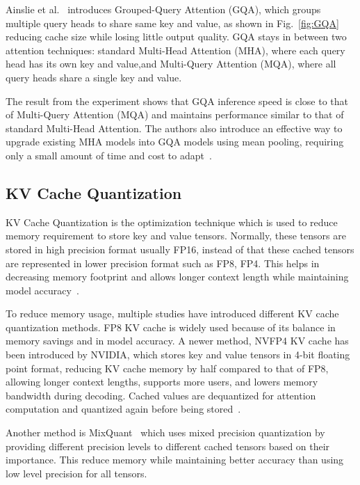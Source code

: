 \documentclass[conference]{IEEEtran}
\begin{document}
Ainslie et al.~\cite{ainslie2023gqa} introduces Grouped-Query Attention (GQA), which groups multiple query heads to share same key and value, as shown in Fig.~\ref{fig:GQA} reducing cache size while losing little output quality. GQA stays in between two attention techniques: standard Multi-Head Attention (MHA), where each query head has its own key and value,and Multi-Query Attention (MQA), where all query heads share a single key and value.

The result from the experiment shows that GQA inference speed is close to that of Multi-Query Attention (MQA) and maintains performance similar to that of standard Multi-Head Attention. The authors also introduce an effective way to upgrade existing MHA models into GQA models using mean pooling, requiring only a small amount of time and cost to adapt~\cite{ainslie2023gqa}.

\subsection{KV Cache Quantization}
KV Cache Quantization is the optimization technique which is used to reduce memory requirement to store key and value tensors. Normally, these tensors are stored in high precision format usually FP16, instead of that these cached tensors are represented in lower precision format such as FP8, FP4. This helps in decreasing memory footprint and allows longer context length while maintaining model accuracy~\cite{nvidia2025nvfp4}.

To reduce memory usage, multiple studies have introduced different KV cache quantization methods. FP8 KV cache is widely used because of its balance in memory savings and in model accuracy. A newer method, NVFP4 KV cache has been introduced by NVIDIA, which stores key and value tensors in 4-bit floating point format, reducing KV cache memory by half compared to that of FP8, allowing longer context lengths, supports more users, and lowers memory bandwidth during decoding. Cached values are dequantized for attention computation and quantized again before being stored~\cite{nvidia2025nvfp4}.

Another method is MixQuant~\cite{lu2026mixquant} which uses mixed precision quantization by providing different precision levels to different cached tensors based on their importance. This reduce memory while maintaining better accuracy than using low level precision for all tensors.
\end{document}
